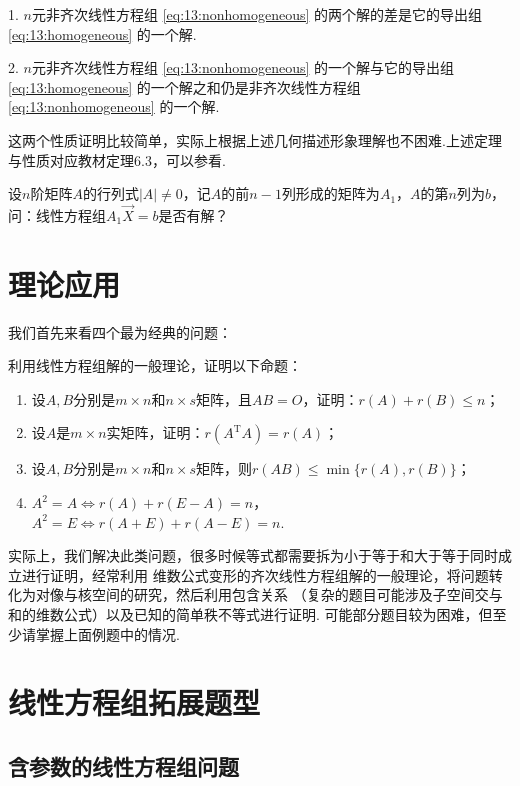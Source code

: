 1. $n$元非齐次线性方程组 \ref*{eq:13:nonhomogeneous} 的两个解的差是它的导出组 \ref*{eq:13:homogeneous} 的一个解.

2. $n$元非齐次线性方程组 \ref*{eq:13:nonhomogeneous} 的一个解与它的导出组 \ref*{eq:13:homogeneous} 的一个解之和仍是非齐次线性方程组 \ref*{eq:13:nonhomogeneous} 的一个解.

这两个性质证明比较简单，实际上根据上述几何描述形象理解也不困难.上述定理与性质对应教材定理6.3，可以参看.
\begin{example}
    设$n$阶矩阵$A$的行列式$|A|\neq 0$，记$A$的前$n-1$列形成的矩阵为$A_1$，$A$的第$n$列为$b$，
    问：线性方程组$A_1\vec{X}=b$是否有解？
\end{example}

\section{理论应用}
我们首先来看四个最为经典的问题：
\begin{example}
    利用线性方程组解的一般理论，证明以下命题：
    \begin{enumerate}
        \item 设$A,B$分别是$m \times n$和$n \times s$矩阵，且$AB=O$，证明：$r(A)+r(B)\leqslant n$；

        \item 设$A$是$m \times n$实矩阵，证明：$r(A^\mathrm{T}A)=r(A)$；

        \item 设$A,B$分别是$m \times n$和$n \times s$矩阵，则$r(AB)\leqslant\min\{r(A),r(B)\}$；

        \item $A^2=A \iff r(A)+r(E-A)=n$，$A^2=E \iff r(A+E)+r(A-E)=n$.
    \end{enumerate}
\end{example}
实际上，我们解决此类问题，很多时候等式都需要拆为小于等于和大于等于同时成立进行证明，经常利用
维数公式变形的齐次线性方程组解的一般理论，将问题转化为对像与核空间的研究，然后利用包含关系
（复杂的题目可能涉及子空间交与和的维数公式）以及已知的简单秩不等式进行证明.
可能部分题目较为困难，但至少请掌握上面例题中的情况.

\section{线性方程组拓展题型}
\subsection{含参数的线性方程组问题}


